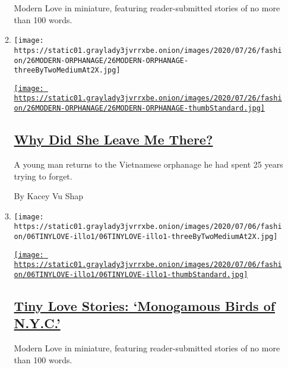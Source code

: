 \begin{enumerate}
\begin{enumerate}
    Modern Love in miniature, featuring reader-submitted stories of no
    more than 100 words.
  \item
    \texttt{[image: https://static01.graylady3jvrrxbe.onion/images/2020/07/26/fashion/26MODERN-ORPHANAGE/26MODERN-ORPHANAGE-threeByTwoMediumAt2X.jpg]}

    \href{/2020/07/24/style/modern-love-adoption-vietnam-why-did-she-leave-me-there.html}{\texttt{[image: https://static01.graylady3jvrrxbe.onion/images/2020/07/26/fashion/26MODERN-ORPHANAGE/26MODERN-ORPHANAGE-thumbStandard.jpg]}}

    \hypertarget{why-did-she-leave-me-there}{%
    \subsection{\texorpdfstring{\href{/2020/07/24/style/modern-love-adoption-vietnam-why-did-she-leave-me-there.html}{Why
    Did She Leave Me
    There?}}{Why Did She Leave Me There?}}\label{why-did-she-leave-me-there}}

    A young man returns to the Vietnamese orphanage he had spent 25
    years trying to forget.

    By Kacey Vu Shap
  \item
    \texttt{[image: https://static01.graylady3jvrrxbe.onion/images/2020/07/06/fashion/06TINYLOVE-illo1/06TINYLOVE-illo1-threeByTwoMediumAt2X.jpg]}

    \href{/2020/07/21/style/tiny-modern-love-stories-coronavirus-monogamous-birds-of-nyc.html}{\texttt{[image: https://static01.graylady3jvrrxbe.onion/images/2020/07/06/fashion/06TINYLOVE-illo1/06TINYLOVE-illo1-thumbStandard.jpg]}}

    \hypertarget{tiny-love-stories-monogamous-birds-of-nyc}{%
    \subsection{\texorpdfstring{\href{/2020/07/21/style/tiny-modern-love-stories-coronavirus-monogamous-birds-of-nyc.html}{Tiny
    Love Stories: `Monogamous Birds of
    N.Y.C.'}}{Tiny Love Stories: `Monogamous Birds of N.Y.C.'}}\label{tiny-love-stories-monogamous-birds-of-nyc}}

    Modern Love in miniature, featuring reader-submitted stories of no
    more than 100 words.
  \end{enumerate}
\end{enumerate}

